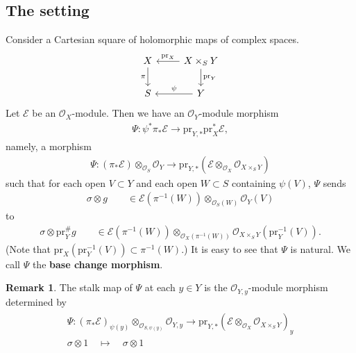\documentclass[12pt,b5paper,notitlepage]{report}
\theoremstyle{definition}
\newtheorem{rem}[df]{Remark}
\theoremstyle{plain}
\newcommand{\scr}{\mathscr}
\newcommand{\pr}{\mathrm {pr}}
\numberwithin{equation}{section}
\begin{document}
\subsection{The setting}\label{lb93}

Consider a Cartesian square of holomorphic maps of complex spaces.
\begin{equation}\label{eq46}
\begin{tikzcd}
X \arrow[d, "\pi"'] & X\times_SY \arrow[l, "\pr_X"'] \arrow[d, "\pr_Y"] \\
S                       & Y \arrow[l, "\psi"']                              
\end{tikzcd}
\end{equation}
Let $\scr E$ be an $\scr O_X$-module. Then we have an $\scr O_Y$-module morphism
\begin{align}
\Psi:\psi^*\pi_*\scr E\longrightarrow \pr_{Y,*}\pr_X^*\scr E,
\end{align}
namely, a morphism
\begin{align}\label{eq43}
\Psi:(\pi_*\scr E)\otimes_{\scr O_S}\scr O_Y\longrightarrow \pr_{Y,*}(\scr E\otimes_{\scr O_X}\scr O_{X\times_SY})
\end{align}
such that for each open $V\subset Y$ and each open $W\subset S$ containing $\psi(V)$, $\Psi$ sends
\begin{align}
\sigma\otimes g\qquad\in \scr E(\pi^{-1}(W))\otimes_{\scr O_S(W)}\scr O_Y(V)
\end{align}
to
\begin{align}
\sigma\otimes \pr_Y^\#g\qquad\in\scr E(\pi^{-1}(W))\otimes_{\scr O_X(\pi^{-1}(W))}\scr O_{X\times_SY}(\pr_Y^{-1}(V)).
\end{align}
(Note that $\pr_X(\pr_Y^{-1}(V))\subset\pi^{-1}(W)$.) It is easy to see that $\Psi$ is natural. We call $\Psi$ the \textbf{base change morphism}.


\begin{rem}\label{lb269}
The stalk map of $\Psi$ at each $y\in Y$ is the $\scr O_{Y,y}$-module morphism determined by
\begin{gather}\label{eq41}
\begin{gathered}
\Psi:(\pi_*\scr E)_{\psi(y)}\otimes_{\scr O_{S,\psi(y)}}\scr O_{Y,y}\longrightarrow \pr_{Y,*}(\scr E\otimes_{\scr O_X}\scr O_{X\times_SY})_y\\[0.8ex]
\sigma\otimes 1\quad\mapsto\quad \sigma\otimes 1
\end{gathered}
\end{gather}
\end{rem}
\end{document}
